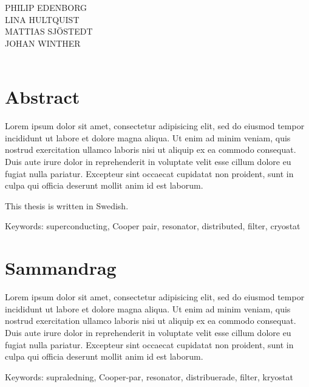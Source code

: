 \documentclass[../../main.tex]{subfiles}
\begin{document}
\titel\\
\undertitel\\
PHILIP EDENBORG\\LINA HULTQUIST\\MATTIAS SJÖSTEDT\\JOHAN WINTHER\\
\department\\
\university \setlength{\parskip}{0.5cm}

\thispagestyle{plain}			%
\setlength{\parskip}{0pt plus 1.0pt}
\section*{Abstract}
Lorem ipsum dolor sit amet, consectetur adipisicing elit, sed do eiusmod tempor incididunt ut labore et dolore magna aliqua. Ut enim ad minim veniam, quis nostrud exercitation ullamco laboris nisi ut aliquip ex ea commodo consequat. Duis aute irure dolor in reprehenderit in voluptate velit esse cillum dolore eu fugiat nulla pariatur. Excepteur sint occaecat cupidatat non proident, sunt in culpa qui officia deserunt mollit anim id est laborum.

This thesis is written in Swedish.

\vfill
Keywords: superconducting, Cooper pair, resonator, distributed, filter, cryostat

\section*{Sammandrag}
Lorem ipsum dolor sit amet, consectetur adipisicing elit, sed do eiusmod tempor incididunt ut labore et dolore magna aliqua. Ut enim ad minim veniam, quis nostrud exercitation ullamco laboris nisi ut aliquip ex ea commodo consequat. Duis aute irure dolor in reprehenderit in voluptate velit esse cillum dolore eu fugiat nulla pariatur. Excepteur sint occaecat cupidatat non proident, sunt in culpa qui officia deserunt mollit anim id est laborum.

\vfill
Keywords: supraledning, Cooper-par, resonator, distribuerade, filter, kryostat

\newpage\null\thispagestyle{empty}\newpage
\end{document}

